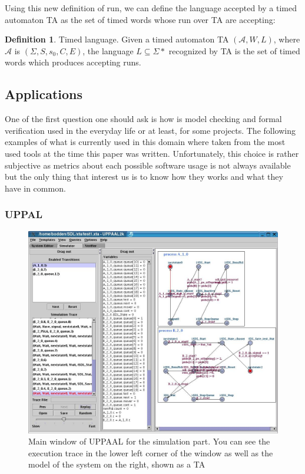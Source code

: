 \documentclass[12pt]{article}
\theoremstyle{definition}
\newtheorem{definition}{Definition}[section]
\theoremstyle{definition}
\newcommand{\A}{\mathcal{A}}
\begin{document}
Using this new definition of run, we can define the language accepted by a timed automaton TA as the set of timed words whose run over TA are accepting:

\theoremstyle{definition}
\begin{definition}{Timed language.} Given a timed automaton TA $(\A, W, L)$, where $\A$ is $(\Sigma, S, s_{0},C, E)$, the language $L \subseteq \Sigma*$ recognized by TA is the set of timed words which produces accepting runs.
\end{definition}

\subsection{Applications}

One of the first question one should ask is how is model checking and formal verification used in the everyday life or at least, for some projects. The following examples of what is currently used in this domain where taken from the most used tools at the time this paper was written. Unfortunately, this choice is rather subjective as metrics about each possible software usage is not always available but the only thing that interest us is to know how they works and what they have in common.

\subsubsection{UPPAL}

\begin{figure}
    \centering
    \includegraphics[scale=0.3]{UPPAAL_trace.jpg}
    \caption{Main window of UPPAAL for the simulation part. You can see the execution trace in the lower left corner of the window as well as the model of the system on the right, shown as a TA}
    \label{UPPAAL}
\end{figure}
\end{document}
